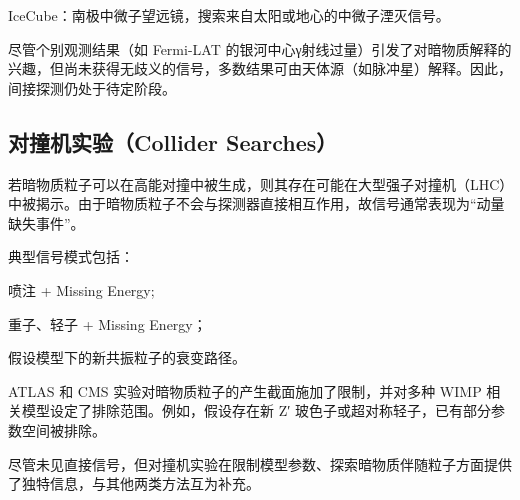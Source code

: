 IceCube：南极中微子望远镜，搜索来自太阳或地心的中微子湮灭信号。

尽管个别观测结果（如 Fermi-LAT 的银河中心γ射线过量）引发了对暗物质解释的兴趣，但尚未获得无歧义的信号，多数结果可由天体源（如脉冲星）解释。因此，间接探测仍处于待定阶段。

\subsection{对撞机实验（Collider Searches）}

若暗物质粒子可以在高能对撞中被生成，则其存在可能在大型强子对撞机（LHC）中被揭示。由于暗物质粒子不会与探测器直接相互作用，故信号通常表现为“动量缺失事件”。

典型信号模式包括：

喷注 + Missing Energy;

重子、轻子 + Missing Energy；

假设模型下的新共振粒子的衰变路径。

ATLAS 和 CMS 实验对暗物质粒子的产生截面施加了限制，并对多种 WIMP 相关模型设定了排除范围。例如，假设存在新 Z′ 玻色子或超对称轻子，已有部分参数空间被排除。

尽管未见直接信号，但对撞机实验在限制模型参数、探索暗物质伴随粒子方面提供了独特信息，与其他两类方法互为补充。

\newpage